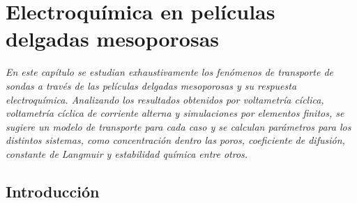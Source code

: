  \newcommand{\NoBiblioEQ}[1]{
 \ifthenelse{\equal{#1}{verdadero}}{}{}
 \NoBiblioEQ{verdadero}}


 \FormatoCapituloDosLineas
 
 \chapter{Electroquímica en películas delgadas mesoporosas}
 \label{chap:Electroquimica}

 \thispagestyle{empty}
	
 \noindent\textit{En este capítulo se estudian exhaustivamente los fenómenos de transporte de sondas a través de las películas delgadas mesoporosas y su respuesta electroquímica. Analizando los resultados obtenidos por voltametría cíclica, voltametría cíclica de corriente alterna y simulaciones por elementos finitos, se sugiere un modelo de transporte para cada caso y se calculan parámetros para los distintos sistemas, como concentración dentro las poros, coeficiente de difusión, constante de Langmuir y estabilidad química entre otros.}

 \vfill
 \minitoc
 \newpage

\section{Introducción}

